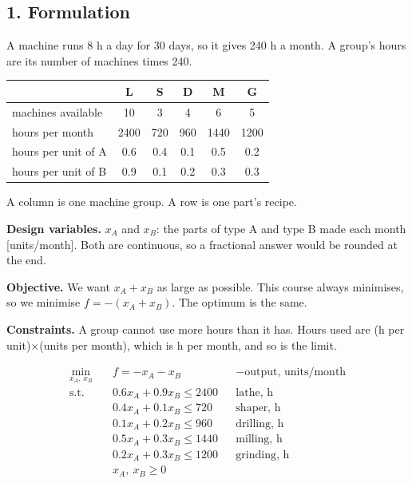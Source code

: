 \documentclass[11pt,a4paper]{article}
\begin{document}
\subsection*{1. Formulation}

A machine runs 8 h a day for 30 days, so it gives 240 h a month. A group's hours
are its number of machines times 240.

\begin{center}
\begin{tabular}{lccccc}
\toprule
 & L & S & D & M & G \\
\midrule
machines available  & 10   & 3   & 4   & 6    & 5    \\
hours per month     & 2400 & 720 & 960 & 1440 & 1200 \\
hours per unit of A & 0.6  & 0.4 & 0.1 & 0.5  & 0.2  \\
hours per unit of B & 0.9  & 0.1 & 0.2 & 0.3  & 0.3  \\
\bottomrule
\end{tabular}
\end{center}

A column is one machine group. A row is one part's recipe.

\textbf{Design variables.} $x_A$ and $x_B$: the parts of type A and type B made
each month [units/month]. Both are continuous, so a fractional answer would be
rounded at the end.

\textbf{Objective.} We want $x_A + x_B$ as large as possible. This course always
minimises, so we minimise $f = -(x_A + x_B)$. The optimum is the same.

\textbf{Constraints.} A group cannot use more hours than it has. Hours used are
(h per unit)$\times$(units per month), which is h per month, and so is the limit.

\begin{align*}
  \min_{x_A,\,x_B} \quad & f = -x_A - x_B && \text{$-$output, units/month} \\
  \text{s.t.} \quad
  & 0.6x_A + 0.9x_B \le 2400 && \text{lathe, h} \\
  & 0.4x_A + 0.1x_B \le 720  && \text{shaper, h} \\
  & 0.1x_A + 0.2x_B \le 960  && \text{drilling, h} \\
  & 0.5x_A + 0.3x_B \le 1440 && \text{milling, h} \\
  & 0.2x_A + 0.3x_B \le 1200 && \text{grinding, h} \\
  & x_A,\ x_B \ge 0
\end{align*}
\end{document}
